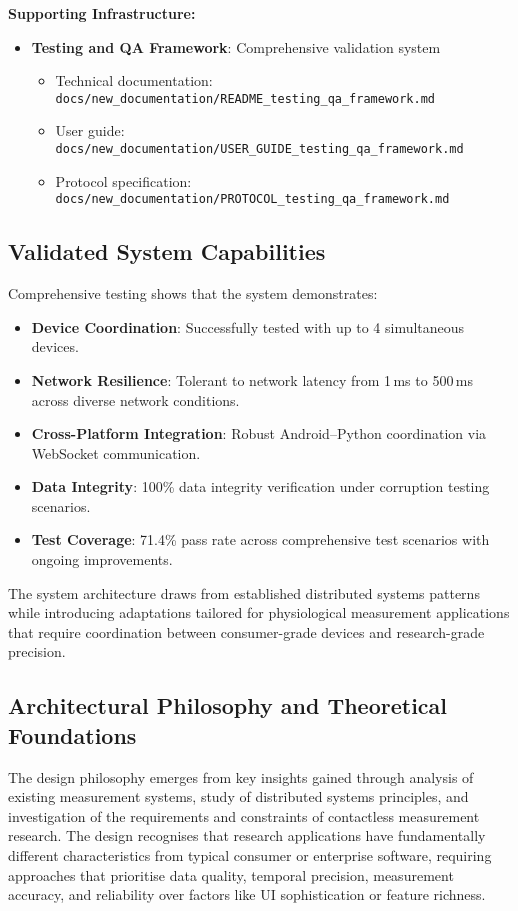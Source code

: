 \documentclass[11pt,a4paper]{report}
\begin{document}
\textbf{Supporting Infrastructure:}
\begin{itemize}
  \item \textbf{Testing and QA Framework}: Comprehensive validation system  
    \begin{itemize}
      \item Technical documentation: \texttt{docs/new\_documentation/README\_testing\_qa\_framework.md}
      \item User guide: \texttt{docs/new\_documentation/USER\_GUIDE\_testing\_qa\_framework.md}
      \item Protocol specification: \texttt{docs/new\_documentation/PROTOCOL\_testing\_qa\_framework.md}
    \end{itemize}
\end{itemize}

\subsection{Validated System Capabilities}

Comprehensive testing shows that the system demonstrates:
\begin{itemize}
  \item \textbf{Device Coordination}: Successfully tested with up to 4 simultaneous devices.
  \item \textbf{Network Resilience}: Tolerant to network latency from 1\,ms to 500\,ms across diverse network conditions.
  \item \textbf{Cross-Platform Integration}: Robust Android--Python coordination via WebSocket communication.
  \item \textbf{Data Integrity}: 100\% data integrity verification under corruption testing scenarios.
  \item \textbf{Test Coverage}: 71.4\% pass rate across comprehensive test scenarios with ongoing improvements.
\end{itemize}

The system architecture draws from established distributed systems patterns while introducing adaptations tailored for physiological measurement applications that require coordination between consumer-grade devices and research-grade precision.

\subsection{Architectural Philosophy and Theoretical Foundations}

The design philosophy emerges from key insights gained through analysis of existing measurement systems, study of distributed systems principles, and investigation of the requirements and constraints of contactless measurement research. The design recognises that research applications have fundamentally different characteristics from typical consumer or enterprise software, requiring approaches that prioritise data quality, temporal precision, measurement accuracy, and reliability over factors like UI sophistication or feature richness.
\end{document}
